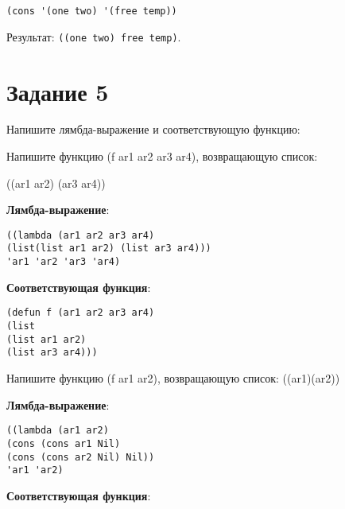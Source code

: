 \begin{lstlisting}
(cons '(one two) '(free temp))
\end{lstlisting}
Результат: \texttt{((one two) free temp)}.
\vspace{10mm}

\section*{Задание 5}
\begin{flushleft}
	Напишите лямбда-выражение и соответствующую функцию:
\end{flushleft}

\vspace{10mm}

\begin{flushleft}
	Напишите функцию (f ar1 ar2 ar3 ar4), возвращающую список: 
	
	((ar1 ar2) (ar3 ar4))
	
	
	\textbf{Лямбда-выражение}:
\end{flushleft}

\begin{lstlisting}
((lambda (ar1 ar2 ar3 ar4) 
(list(list ar1 ar2) (list ar3 ar4))) 
'ar1 'ar2 'ar3 'ar4)
\end{lstlisting}
\vspace{5mm}

\begin{flushleft}
	\textbf{Соответствующая функция}:
\end{flushleft}

\begin{lstlisting}
(defun f (ar1 ar2 ar3 ar4) 
(list
(list ar1 ar2) 
(list ar3 ar4)))
\end{lstlisting}

\vspace{5mm}

\begin{flushleft}
	Напишите функцию (f ar1 ar2), возвращающую список: 
	((ar1)(ar2))
	
	
	
	\textbf{Лямбда-выражение}:
\end{flushleft}

\begin{lstlisting}
((lambda (ar1 ar2) 
(cons (cons ar1 Nil) 
(cons (cons ar2 Nil) Nil)) 
'ar1 'ar2)
\end{lstlisting}
\vspace{5mm}

\begin{flushleft}
	\textbf{Соответствующая функция}:
\end{flushleft}

